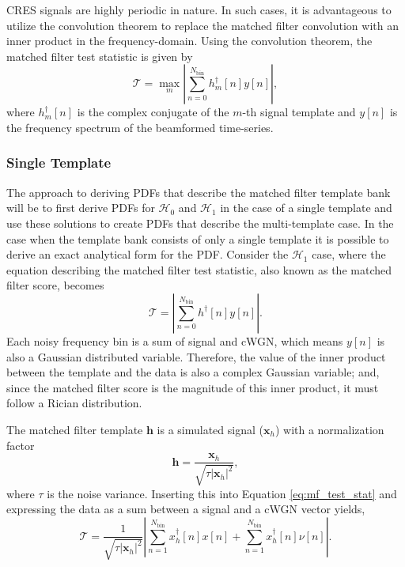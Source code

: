 CRES signals are highly periodic in nature. In such cases, it is advantageous to utilize the convolution theorem to replace the matched filter convolution with an inner product in the frequency-domain. Using the convolution theorem, the matched filter test statistic is given by
\begin{equation}
    \mathcal{T}=\max_{m}\left|\sum_{n=0}^{N_\mathrm{bin}}h_m^\dagger[n]y[n]\right|,
    \label{eq:mf_test_stat}
\end{equation}
where $h_m^\dagger[n]$ is the complex conjugate of the $m$-th signal template and $y[n]$ is the frequency spectrum of the beamformed time-series. 

\subsubsection*{Single Template}

The approach to deriving PDFs that describe the matched filter template bank will be to first derive PDFs for $\mathcal{H}_0$ and $\mathcal{H}_1$ in the case of a single template and use these solutions to create PDFs that describe the multi-template case. In the case when the template bank consists of only a single template it is possible to derive an exact analytical form for the PDF. Consider the $\mathcal{H}_1$ case, where the equation describing the matched filter test statistic, also known as the matched filter score, becomes
\begin{equation}
    \mathcal{T}=\left|\sum_{n=0}^{N_\mathrm{bin}}h^\dagger[n]y[n]\right|.
    \label{eq:mf_inner_prod_1}
\end{equation}
Each noisy frequency bin is a sum of signal and cWGN, which means $y[n]$ is also a Gaussian distributed variable. Therefore, the value of the inner product between the template and the data is also a complex Gaussian variable; and, since the matched filter score is the magnitude of this inner product, it must follow a Rician distribution. 

The matched filter template $\mathbf{h}$ is a simulated signal ($\mathbf{x}_h$) with a normalization factor
\begin{equation}
    \mathbf{h}=\frac{\mathbf{x}_h}{\sqrt{\tau|\mathbf{x}_h|^2}},
    \label{eq:appendix-mf-template}
\end{equation}
where $\tau$ is the noise variance. Inserting this into Equation \ref{eq:mf_test_stat} and expressing the data as a sum between a signal and a cWGN vector yields,
\begin{equation}
    \mathcal{T}=\frac{1}{\sqrt{\tau|\mathbf{x}_h|^2}}\left|\sum_{n=1}^{N_\mathrm{bin}}{x_h^\dagger[n]x[n]} + \sum_{n=1}^{N_\mathrm{bin}}{x_h^\dagger[n]\nu[n]}\right|.
    \label{eq:appendix-eqn-1}
\end{equation}

